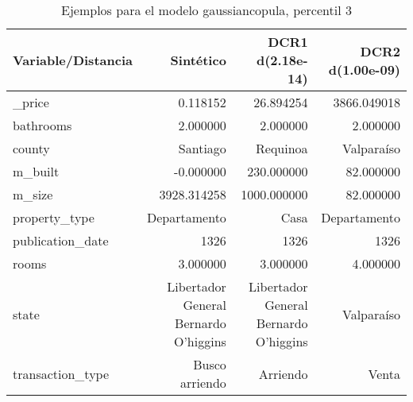 \begin{table}[H]
\centering
\fontsize{10}{14}\selectfont
\caption{Ejemplos para el modelo gaussiancopula, percentil 3}
\label{table-example-economicos-b-2-gaussiancopula-3p}
\begin{tabular}{|l|r|r|r|}
\hline
\rowcolor[gray]{0.8}
Variable/Distancia & Sintético & DCR1 d(2.18e-14) & DCR2 d(1.00e-09) \\
\hline \_price & \cellcolor[rgb]{0.9, 0.54, 0.52} 0.118152 & 26.894254 & 3866.049018 \\
\hline bathrooms & \cellcolor[rgb]{0.9, 0.54, 0.52} 2.000000 & \cellcolor[rgb]{0.9, 0.54, 0.52} 2.000000 & \cellcolor[rgb]{0.9, 0.54, 0.52} 2.000000 \\
\hline county & \cellcolor[rgb]{0.9, 0.54, 0.52} Santiago & Requinoa & Valparaíso \\
\hline m\_built & \cellcolor[rgb]{0.9, 0.54, 0.52} -0.000000 & 230.000000 & 82.000000 \\
\hline m\_size & \cellcolor[rgb]{0.9, 0.54, 0.52} 3928.314258 & 1000.000000 & 82.000000 \\
\hline property\_type & \cellcolor[rgb]{0.9, 0.54, 0.52} Departamento & Casa & \cellcolor[rgb]{0.9, 0.54, 0.52} Departamento \\
\hline publication\_date & \cellcolor[rgb]{0.9, 0.54, 0.52} 1326 & \cellcolor[rgb]{0.9, 0.54, 0.52} 1326 & \cellcolor[rgb]{0.9, 0.54, 0.52} 1326 \\
\hline rooms & \cellcolor[rgb]{0.9, 0.54, 0.52} 3.000000 & \cellcolor[rgb]{0.9, 0.54, 0.52} 3.000000 & 4.000000 \\
\hline state & \cellcolor[rgb]{0.9, 0.54, 0.52} Libertador General Bernardo O'higgins & \cellcolor[rgb]{0.9, 0.54, 0.52} Libertador General Bernardo O'higgins & Valparaíso \\
\hline transaction\_type & \cellcolor[rgb]{0.9, 0.54, 0.52} Busco arriendo & Arriendo & Venta \\
\hline
\end{tabular}
\end{table}
